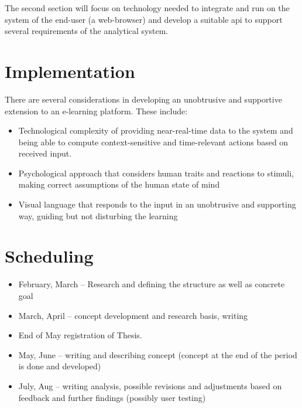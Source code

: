 The second section will focus on technology needed to integrate and run on the system of the end-user (a web-browser) and develop a suitable api to support several requirements of the analytical system.

\section{Implementation}

There are several considerations in developing an unobtrusive and supportive extension to an e-learning platform. These include:

\begin{itemize}
	\item Technological complexity of providing near-real-time data to the system and being able to compute context-sensitive and time-relevant actions based on received input.
	\item Psychological approach that considers human traits and reactions to stimuli, making correct assumptions of the human state of mind
	\item Visual language that responds to the input in an unobtrusive and supporting way, guiding but not disturbing the learning  \cite{dix2003human,few2013information}
\end{itemize}



\section{Scheduling}
\begin{itemize}
	\item February, March – Research and defining the structure as well as concrete goal
	\item March, April – concept development and research basis, writing
	\item End of May registration of Thesis.
	\item May, June – writing and describing concept (concept at the end of the period is done and developed)
	\item July, Aug – writing analysis, possible revisions and adjustments based on feedback and further findings (possibly user testing)
\end{itemize}

